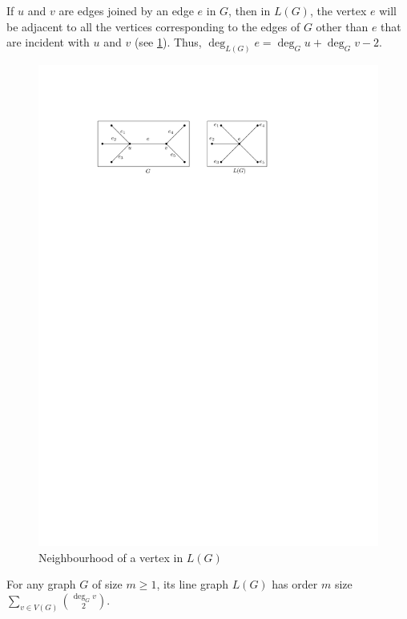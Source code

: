 If $u$ and $v$ are edges joined by an edge $e$ in $G$, then in $L(G)$, the vertex $e$ will be adjacent to all the vertices corresponding to the edges of $G$ other than $e$ that are incident with $u$ and $v$ (see \cref{fig:L(G)Neighbourhood}). Thus, $\deg_{L(G)} e = \deg_G u + \deg_G v - 2$.
\begin{figure}[!htbp]
\centering
\includegraphics{Images/L(G)Neighbourhood.pdf}
\caption{Neighbourhood of a vertex in $L(G)$}
\label{fig:L(G)Neighbourhood}
\end{figure}

\begin{Theorem}
For any graph $G$ of size $m \ge 1$, its line graph $L(G)$ has order $m$ size $\displaystyle\sum_{v \in V(G)} \binom{\deg_G v}{2}$.
\end{Theorem}


